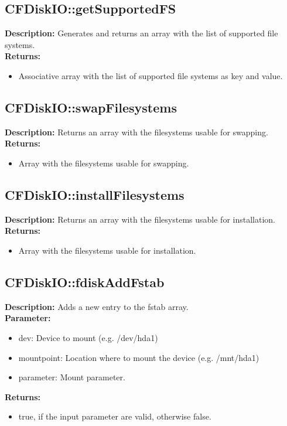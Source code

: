 \subsection{CFDiskIO::getSupportedFS}
\textbf{Description:} Generates and returns an array with the list of supported file systems.\\
\textbf{Returns:}
\begin{itemize}
\item Associative array with the list of supported file systems as key and value.
\end{itemize}

\subsection{CFDiskIO::swapFilesystems}
\textbf{Description:} Returns an array with the filesystems usable for swapping.\\
\textbf{Returns:}
\begin{itemize}
\item Array with the filesystems usable for swapping.
\end{itemize}

\subsection{CFDiskIO::installFilesystems}
\textbf{Description:} Returns an array with the filesystems usable for installation.\\
\textbf{Returns:}
\begin{itemize}
\item Array with the filesystems usable for installation.
\end{itemize}

\subsection{CFDiskIO::fdiskAddFstab}
\textbf{Description:} Adds a new entry to the fstab array.\\
\textbf{Parameter:}
\begin{itemize}
\item dev: Device to mount (e.g. /dev/hda1)
\item mountpoint: Location where to mount the device (e.g. /mnt/hda1)
\item parameter: Mount parameter.
\end{itemize}
\textbf{Returns:}
\begin{itemize}
\item true, if the input parameter are valid, otherwise false.
\end{itemize}

